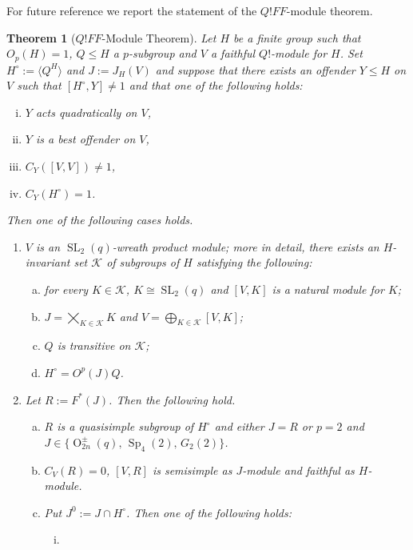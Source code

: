 \documentclass{amsart}
\numberwithin{equation}{section}
\newtheorem{theorem}[equation]{Theorem}
\theoremstyle{definition}
\theoremstyle{subresult}
\theoremstyle{caseresult}
\newcommand{\K}{\mathcal{K}}
\newcommand{\SL}{\operatorname{SL}}
\newcommand{\Sp}{\operatorname{Sp}}
\renewcommand{\O}{\operatorname{O}}
\newcommand{\<}{\langle}
\renewcommand{\>}{\rangle}
\begin{document}
For future reference we report the statement of the $Q!FF$-module theorem.

\begin{theorem}[$Q!FF$-Module Theorem]\label{thm:Q!FF}
	Let $H$ be a finite group such that $O_p(H) = 1$, $Q \le H$ a $p$-subgroup and $V$ a faithful $Q!$-module for $H$. Set $H^\circ := \< Q^H \>$ and $J := J_H(V)$ and suppose that there exists an offender $Y \le H$ on $V$ such that $[H^\circ,Y] \ne 1$ and that one of the following holds:
	\begin{enumerate}[(i)]
		\item $Y$ acts quadratically on $V$,
		\item $Y$ is a best offender on $V$,
		\item $C_Y([V,V]) \ne 1$,
		\item $C_Y(H^\circ) =1$.
	\end{enumerate}
	Then one of the following cases holds.
	\begin{enumerate}[(1)]
		\item $V$ is an $\SL_2(q)$-wreath product module; more in  detail, there exists an $H$-invariant set $\K$ of subgroups of $H$ satisfying the following:
		\begin{enumerate}[(a)]
			\item for every $K \in \K$, $K \cong \SL_2(q)$ and $[V,K]$ is a natural module for $K$;
			\item $\displaystyle J = \bigtimes_{K \in \K} K$ and $\displaystyle V=\bigoplus_{K \in \K} [V,K]$;
			\item $Q$ is transitive on $\K$;
			\item $H^\circ = O^p(J)Q$.
		\end{enumerate}
		\item Let $R:=F^*(J)$. Then the following hold.
		\begin{enumerate}[(a)]
			\item $R$ is a quasisimple subgroup of $H^\circ$ and either $J=R$ or $p=2$ and $J \in \{\O^{\pm}_{2n}(q), \, \Sp_4(2), \, G_2(2) \}$.
			\item $C_V(R) = 0$, $[V,R]$ is semisimple as $J$-module and faithful as $H$-module.
			\item Put $J^0 := J \cap H^\circ$. Then one of the following holds:
			\begin{enumerate}[(i)]
				\item {}
\end{enumerate}
\end{enumerate}
\end{enumerate}
\end{theorem}
\end{document}
